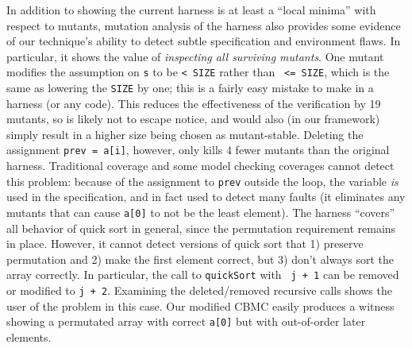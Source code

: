 \documentclass[conference]{IEEEtran}
\begin{document}
In addition to showing the current harness is at least a ``local
minima'' with respect to mutants, mutation analysis of the harness
also provides some evidence of our technique's ability to detect
subtle specification and environment flaws.  In particular, it shows
the value of \emph{inspecting all surviving mutants}.  One mutant
modifies the assumption on {\tt s} to be {\tt < SIZE} rather than {\tt
  <= SIZE}, which is the same as lowering the {\tt SIZE} by one; this
is a fairly easy mistake to make in a harness (or any code).  This reduces the
effectiveness of the verification by 19 mutants, so is likely not to
escape notice, and would also (in our framework) simply result in a
higher size being chosen as mutant-stable.  Deleting the assignment
{\tt prev = a[i]}, however, only kills 4 fewer mutants than the
original harness.  Traditional coverage and some model checking coverages
cannot detect this problem: because of the assignment to {\tt prev}
outside the loop, the variable \emph{is} used in the specification, and in
fact used to detect many faults (it eliminates any mutants that can
cause {\tt a[0]} to not be the least element).  The harness ``covers'' all behavior of quick sort in general, since
the permutation requirement remains in place.  However, it cannot
detect versions of quick sort that 1) preserve permutation and 2) make
the first element correct, but 3) don't always sort the
array correctly.  In particular, the call to {\tt quickSort} with {\tt
  j + 1} can be removed or modified to {\tt j + 2}.
Examining the deleted/removed recursive calls shows the user of
the problem in this case.  Our modified CBMC easily produces a witness showing a permutated array with correct
{\tt a[0]} but with out-of-order later elements.
\end{document}
